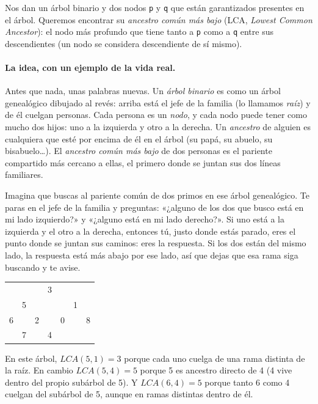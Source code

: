 
Nos dan un árbol binario y dos nodos \texttt{p} y \texttt{q} que están
garantizados presentes en el árbol. Queremos encontrar su \emph{ancestro
común más bajo} (LCA, \emph{Lowest Common Ancestor}): el nodo más profundo
que tiene tanto a \texttt{p} como a \texttt{q} entre sus descendientes (un
nodo se considera descendiente de sí mismo).

\paragraph{La idea, con un ejemplo de la vida real.} Antes que nada, unas
palabras nuevas. Un \emph{árbol binario} es como un árbol genealógico dibujado
al revés: arriba está el jefe de la familia (lo llamamos \emph{raíz}) y de él
cuelgan personas. Cada persona es un \emph{nodo}, y cada nodo puede tener como
mucho dos hijos: uno a la izquierda y otro a la derecha. Un \emph{ancestro} de
alguien es cualquiera que esté por encima de él en el árbol (su papá, su abuelo,
su bisabuelo\ldots). El \emph{ancestro común más bajo} de dos personas es el
pariente compartido más cercano a ellas, el primero donde se juntan sus dos
líneas familiares.

Imagina que buscas al pariente común de dos primos en ese árbol genealógico.
Te paras en el jefe de la familia y preguntas: «¿alguno de los dos que busco
está en mi lado izquierdo?» y «¿alguno está en mi lado derecho?». Si uno está a
la izquierda y el otro a la derecha, entonces tú, justo donde estás parado, eres
el punto donde se juntan sus caminos: eres la respuesta. Si los dos están del
mismo lado, la respuesta está más abajo por ese lado, así que dejas que esa rama
siga buscando y te avise.

\begin{center}
\ttfamily
\begin{tabular}{ccccccc}
 & & & 3 & & & \\
 & 5 & & & & 1 & \\
6 & & 2 & & 0 & & 8\\
 & 7 & & 4 & & & \\
\end{tabular}
\end{center}

\noindent En este árbol, $LCA(5,1)=3$ porque cada uno cuelga de una rama
distinta de la raíz. En cambio $LCA(5,4)=5$ porque 5 es ancestro directo de
4 (4 vive dentro del propio subárbol de 5). Y $LCA(6,4)=5$ porque tanto 6
como 4 cuelgan del subárbol de 5, aunque en ramas distintas dentro de él.

